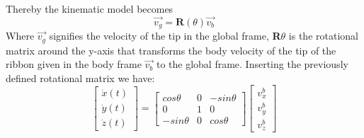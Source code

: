 Thereby the kinematic model becomes
\begin{equation}
    \vec{v_g} = \textbf{R}(\theta) \vec{v_b}
\end{equation}
Where $\vec{v_g}$ signifies the velocity of the tip in the global frame, \textbf{R}$\theta$ is the rotational matrix around the y-axis that transforms the body velocity of the tip of the ribbon given in the body frame $\vec{v_b}$ to the global frame. Inserting the previously defined rotational matrix we have:
\begin{equation}
    \begin{bmatrix}
        \dot{x}(t)\\ \dot{y}(t)\\ \dot{z}(t)
    \end{bmatrix} = 
    \begin{bmatrix}
        cos \theta   &   0   &   -sin \theta \\
        0            &   1   &   0\\
       -sin \theta   &   0   &   cos \theta
    \end{bmatrix}
    \begin{bmatrix}
        v_x^b \\ v_y^b \\ v_z^b
    \end{bmatrix}
\end{equation}

